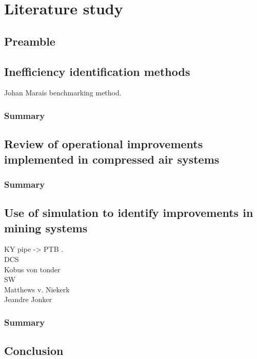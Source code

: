 \chapter{Literature study}
\section{Preamble}
\section{Inefficiency identification methods}
Johan Marais benchmarking method.
	\subsection{Summary}
\section{Review of operational improvements implemented in compressed air systems}
	\subsection{Summary}
\section{Use of simulation to identify improvements in mining systems}
KY pipe -> PTB .\\
DCS\\
Kobus von tonder\\
SW\\
Matthews v. Niekerk\\
Jeandre Jonker
	\subsection{Summary}
\section{Conclusion}